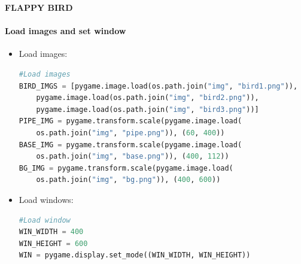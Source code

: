 \documentclass[10pt]{beamer}
\begin{document}
{
%
\begin{frame}[fragile]{\textbf{FLAPPY BIRD}}
    \framesubtitle{\textbf{Load images and set window}}
    \begin{itemize}
        \item Load images: \\
            \begin{lstlisting}[language=Python]
    #Load images
BIRD_IMGS = [pygame.image.load(os.path.join("img", "bird1.png")),
    pygame.image.load(os.path.join("img", "bird2.png")),
    pygame.image.load(os.path.join("img", "bird3.png"))]
PIPE_IMG = pygame.transform.scale(pygame.image.load(
    os.path.join("img", "pipe.png")), (60, 400))
BASE_IMG = pygame.transform.scale(pygame.image.load(
    os.path.join("img", "base.png")), (400, 112))
BG_IMG = pygame.transform.scale(pygame.image.load(
    os.path.join("img", "bg.png")), (400, 600))
            \end{lstlisting}
        \pause 
        \item Load windows: \\
        \begin{lstlisting}[language=Python]
    #Load window
WIN_WIDTH = 400
WIN_HEIGHT = 600
WIN = pygame.display.set_mode((WIN_WIDTH, WIN_HEIGHT))
        \end{lstlisting}
    \end{itemize}
\end{frame}
}
\end{document}
